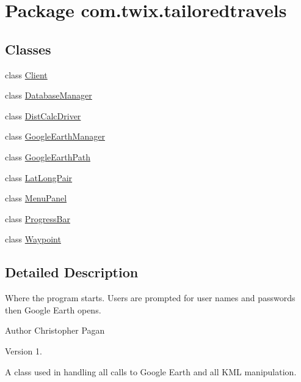 \hypertarget{namespacecom_1_1twix_1_1tailoredtravels}{\section{Package com.\-twix.\-tailoredtravels}
\label{namespacecom_1_1twix_1_1tailoredtravels}
}
\subsection*{Classes}
\begin{DoxyCompactItemize}
\item 
class \hyperlink{classcom_1_1twix_1_1tailoredtravels_1_1_client}{Client}
\item 
class \hyperlink{classcom_1_1twix_1_1tailoredtravels_1_1_database_manager}{Database\-Manager}
\item 
class \hyperlink{classcom_1_1twix_1_1tailoredtravels_1_1_dist_calc_driver}{Dist\-Calc\-Driver}
\item 
class \hyperlink{classcom_1_1twix_1_1tailoredtravels_1_1_google_earth_manager}{Google\-Earth\-Manager}
\item 
class \hyperlink{classcom_1_1twix_1_1tailoredtravels_1_1_google_earth_path}{Google\-Earth\-Path}
\item 
class \hyperlink{classcom_1_1twix_1_1tailoredtravels_1_1_lat_long_pair}{Lat\-Long\-Pair}
\item 
class \hyperlink{classcom_1_1twix_1_1tailoredtravels_1_1_menu_panel}{Menu\-Panel}
\item 
class \hyperlink{classcom_1_1twix_1_1tailoredtravels_1_1_progress_bar}{Progress\-Bar}
\item 
class \hyperlink{classcom_1_1twix_1_1tailoredtravels_1_1_waypoint}{Waypoint}
\end{DoxyCompactItemize}


\subsection{Detailed Description}
Where the program starts. Users are prompted for user names and passwords then Google Earth opens.

\begin{DoxyAuthor}{Author}
Christopher Pagan 
\end{DoxyAuthor}
\begin{DoxyVersion}{Version}
1.
\end{DoxyVersion}
A class used in handling all calls to Google Earth and all K\-M\-L manipulation.

